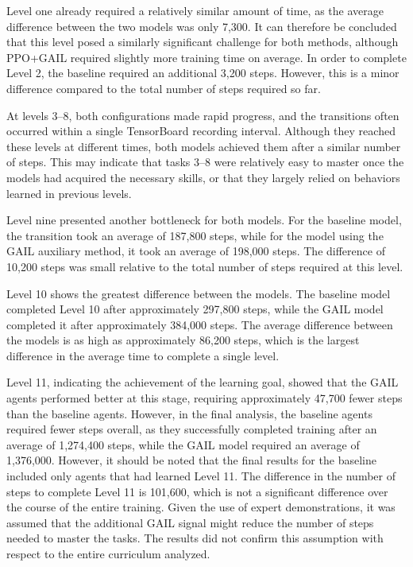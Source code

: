 Level one already required a relatively similar amount of time, as the average difference between the two models was only 7,300. It can therefore be concluded that this level posed a similarly significant challenge for both methods, although PPO+GAIL required slightly more training time on average.
In order to complete Level 2, the baseline required an additional 3,200 steps. However, this is a minor difference compared to the total number of steps required so far.

At levels 3–8, both configurations made rapid progress, and the transitions often occurred within a single TensorBoard recording interval. Although they reached these levels at different times, both models achieved them after a similar number of steps. This may indicate that tasks 3–8 were relatively easy to master once the models had acquired the necessary skills, or that they largely relied on behaviors learned in previous levels. 

Level nine presented another bottleneck for both models. For the baseline model, the transition took an average of 187,800 steps, while for the model using the GAIL auxiliary method, it took an average of 198,000 steps. The difference of 10,200 steps was small relative to the total number of steps required at this level.

Level 10 shows the greatest difference between the models. The baseline model completed Level 10 after approximately 297,800 steps, while the GAIL model completed it after approximately 384,000 steps. The average difference between the models is as high as approximately 86,200 steps, which is the largest difference in the average time to complete a single level.

Level 11, indicating the achievement of the learning goal, showed that the GAIL agents performed better at this stage, requiring approximately 47,700 fewer steps than the baseline agents. However, in the final analysis, the baseline agents required fewer steps overall, as they successfully completed training after an average of 1,274,400 steps, while the GAIL model required an average of 1,376,000. However, it should be noted that the final results for the baseline included only agents that had learned Level 11. The difference in the number of steps to complete Level 11 is 101,600, which is not a significant difference over the course of the entire training. Given the use of expert demonstrations, it was assumed that the additional GAIL signal might reduce the number of steps needed to master the tasks. The results did not confirm this assumption with respect to the entire curriculum analyzed.

